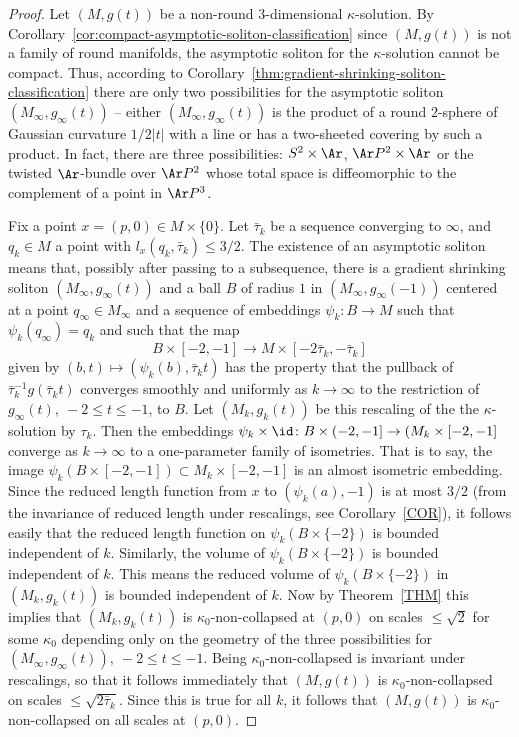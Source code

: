 \begin{proof}
Let $(M,g(t))$ be a non-round $3$-dimensional $\kappa$-solution. By
Corollary~\ref{cor:compact-asymptotic-soliton-classification} since $(M,g(t))$ is not a family of
round manifolds, the asymptotic soliton for the $\kappa$-solution
cannot be compact. Thus, according to Corollary~\ref{thm:gradient-shrinking-soliton-classification} there
are only two possibilities for the asymptotic soliton
$(M_\infty,g_\infty(t))$ -- either $(M_\infty,g_\infty(t))$ is the
product of a round $2$-sphere of Gaussian curvature $1/2|t|$ with a
line or has a two-sheeted covering by such a product. In fact, there
are three possibilities: $S^2\times \Ar$, $\Ar P^2\times \Ar$ or the
twisted $\Ar$-bundle over $\Ar P^2$ whose total space is
diffeomorphic to the complement of a point in $\Ar P^3$.


Fix a point $x=(p,0)\in M\times\{0\}$. Let $\bar\tau_k$ be a
sequence converging to $\infty$, and $q_k\in M$ a point with
$l_{x}(q_k,\bar\tau_k)\le 3/2$. The existence of an asymptotic
soliton means that, possibly after passing to a subsequence, there
is a gradient shrinking soliton $(M_\infty,g_\infty(t))$ and a ball
$B$ of radius $1$ in $(M_\infty,g_\infty(-1))$ centered at a point
$q_\infty\in M_\infty$ and a sequence of embeddings $\psi_k\colon
B\to M$ such that $\psi_k(q_\infty)=q_k$ and such that the map
$$B\times [-2,-1]\to M\times [-2\bar\tau_k,-\bar\tau_k]$$
given by $(b,t)\mapsto (\psi_k(b),\bar\tau_kt)$ has the property
that the pullback of $\bar\tau^{-1}_kg(\bar\tau_k t)$ converges
smoothly and uniformly as $k\rightarrow\infty$ to the restriction of
$g_\infty(t),\ -2\le t\le -1$, to $B$. Let $(M_k,g_k(t))$ be this
rescaling of the the $\kappa$-solution by $\tau_k$. Then the
embeddings $\psi_k\times \id\colon B\times (-2,-1]\to
(M_k\times [-2,-1]$ converge as $k\rightarrow \infty$ to a
one-parameter family of isometries. That is to say, the image
$\psi_k(B\times [-2,-1])\subset M_k\times [-2,-1]$ is an almost
isometric embedding. Since the reduced length function from $x$ to
$(\psi_k(a),-1)$ is at most $3/2$ (from the invariance of reduced
length under rescalings, see Corollary~\ref{COR}), it follows easily
that the reduced length function on $\psi_k(B\times \{-2\})$ is
bounded independent of $k$. Similarly, the volume of
$\psi_k(B\times\{-2\})$ is bounded independent of $k$. This means
the reduced volume of $\psi_k(B\times\{-2\})$ in $(M_k,g_k(t))$ is
bounded independent of $k$. Now by Theorem~\ref{THM} this implies
that $(M_k,g_k(t))$ is $\kappa_0$-non-collapsed at $(p,0)$ on scales
$\le \sqrt{2}$ for some $\kappa_0$ depending only on the geometry of
the three possibilities for $(M_\infty,g_\infty(t)),\ -2\le t\le
-1$. Being $\kappa_0$-non-collapsed is invariant under rescalings,
so that it follows immediately that $(M,g(t))$ is
$\kappa_0$-non-collapsed on scales $\le \sqrt{2\bar\tau_k}$. Since
this is true for all $k$, it follows that $(M,g(t))$ is
$\kappa_0$-non-collapsed on all scales at $(p,0)$.


\end{proof}

